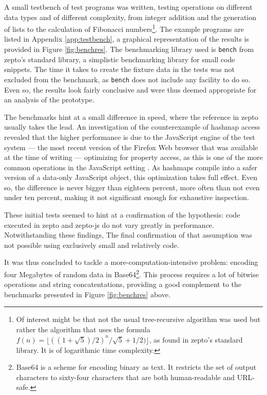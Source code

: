 \documentclass[oneside,11pt,xetex]{scrbook}
\begin{document}
A small testbench of test programs was written, testing operations on
different data types and of different complexity, from integer addition and
the generation of lists to the calculation of Fibonacci numbers\footnote{Of interest
might be that not the usual tree-recursive algorithm was used but rather the
algorithm that uses the formula \(f(n) = \lfloor{((1 + \sqrt{5}) / 2)^n / \sqrt{5} + 1/2)}\rfloor\),
as found in zepto's standard library. It is of logarithmic time complexity.}.
The example programs are listed in Appendix \ref{app:testbench}, a graphical
representation of the results is provided in Figure \ref{fig:benchres}. The
benchmarking library used is \texttt{bench} from zepto's standard library,
a simplistic benchmarking library for small code snippets. The time it takes to
create the fixture data in the tests was not excluded from the benchmark, as
\texttt{bench} does not include any facility to do so. Even so, the results look
fairly conclusive and were thus deemed appropriate for an analysis of the
prototype.

The benchmarks hint at a small difference in speed, where the reference
in zepto usually takes the lead. An investigation of the counterexample of
hashmap access revealed that the higher performance is due to the JavaScript
engine of the test system --- the most recent version of the Firefox Web browser
that was available at the time of writing --- optimizing for property access, as
this is one of the more common operations in the JavaScript setting \parencite{JSPA}.
As hashmaps compile into a safer version of a data-only JavaScript object, this
optimization takes full effect. Even so, the difference is never bigger than eighteen
percent, more often than not even under ten percent, making it not significant enough
for exhaustive inspection.

These initial tests seemed to hint at a confirmation of the hypothesis: code executed
in zepto and zepto-js do not vary greatly in performance. Notwithstanding these
findings, The final confirmation of that assumption was not possible using exclusively
small and relatively code.

It was thus concluded to tackle a more-computation-intensive problem:
encoding four Megabytes of random data in Base64\footnote{Base64 is a scheme
for encoding binary as text. It restricts the set of output characters to
sixty-four characters that are both human-readable and URL-safe.}. This
process requires a lot of bitwise operations and string concatentations,
providing a good complement to the benchmarks presented in Figure
\ref{fig:benchres} above.
\end{document}

